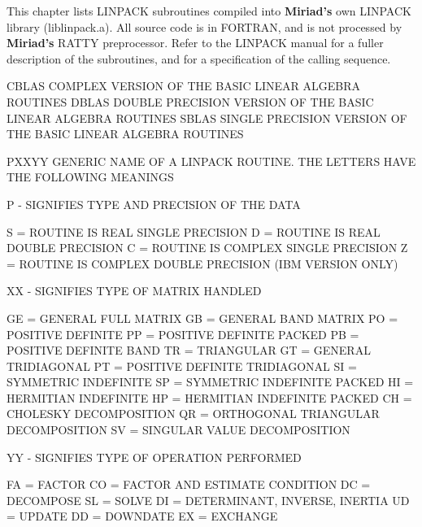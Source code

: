 
\par This chapter lists LINPACK subroutines compiled into {\bf Miriad's}
own LINPACK library (liblinpack.a).  All source code is in FORTRAN,
and is not processed by {\bf Miriad's} RATTY preprocessor.  Refer to
the LINPACK manual for a fuller description of the subroutines, and
for a specification of the calling sequence.

{\eightpoint\begintt
CBLAS     COMPLEX VERSION OF THE BASIC LINEAR ALGEBRA ROUTINES
DBLAS     DOUBLE PRECISION VERSION OF THE BASIC LINEAR ALGEBRA ROUTINES
SBLAS     SINGLE PRECISION VERSION OF THE BASIC LINEAR ALGEBRA ROUTINES
\endtt}
{\eightpoint\begintt
PXXYY     GENERIC NAME OF A LINPACK ROUTINE. THE LETTERS HAVE
          THE FOLLOWING MEANINGS
  
          P - SIGNIFIES TYPE AND PRECISION OF THE DATA
  
              S = ROUTINE IS REAL SINGLE PRECISION
              D = ROUTINE IS REAL DOUBLE PRECISION
              C = ROUTINE IS COMPLEX SINGLE PRECISION
              Z = ROUTINE IS COMPLEX DOUBLE PRECISION (IBM VERSION ONLY)
  
          XX - SIGNIFIES TYPE OF MATRIX HANDLED
  
               GE = GENERAL FULL MATRIX
               GB = GENERAL BAND MATRIX
               PO = POSITIVE DEFINITE
               PP = POSITIVE DEFINITE PACKED
               PB = POSITIVE DEFINITE BAND
               TR = TRIANGULAR
               GT = GENERAL TRIDIAGONAL
               PT = POSITIVE DEFINITE TRIDIAGONAL
               SI = SYMMETRIC INDEFINITE
               SP = SYMMETRIC INDEFINITE PACKED
               HI = HERMITIAN INDEFINITE
               HP = HERMITIAN INDEFINITE PACKED
               CH = CHOLESKY DECOMPOSITION
               QR = ORTHOGONAL TRIANGULAR DECOMPOSITION
               SV = SINGULAR VALUE DECOMPOSITION
  
          YY - SIGNIFIES TYPE OF OPERATION PERFORMED
  
               FA = FACTOR
               CO = FACTOR AND ESTIMATE CONDITION
               DC = DECOMPOSE
               SL = SOLVE
               DI = DETERMINANT, INVERSE, INERTIA
               UD = UPDATE
               DD = DOWNDATE
               EX = EXCHANGE
\endtt}
\vfill
\eject

